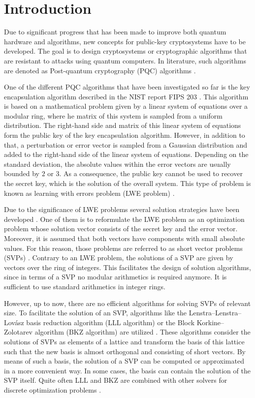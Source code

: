 \section{Introduction}

Due to significant progress that has been made to improve both quantum hardware and algorithms, new concepts for public-key cryptosystems have to be developed. The goal is to design cryptosystems or cryptographic algorithms that are resistant to attacks using quantum computers. In literature, such algorithms are denoted as Post-quantum cryptography (PQC) algorithms \cite{kumar2020post,bernstein17}. 

One of the different PQC algorithms that have been investigated so far is the key encapsulation algorithm described in the NIST report FIPS 203 \cite{NIST203}. This algorithm is based on a mathematical problem given by a linear system of equations over a modular ring, where he matrix of this system is sampled from a uniform distribution. The right-hand side and matrix of this linear system of equations form the public key of the key encapsulation algorithm. However, in addition to that, a perturbation or error vector is sampled from a Gaussian distribution and added to the right-hand side of the linear system of equations. Depending on the standard deviation, the absolute values within the error vectors are usually bounded by $2$ or $3$. As a consequence, the public key cannot be used to recover the secret key, which is the solution of the overall system. This type of problem is known as learning with errors problem (LWE problem) \cite{Albrecht17}. 

Due to the significance of LWE problems several solution strategies have been developed \cite{Peikert16}. One of them is to reformulate the LWE problem as an optimization problem whose solution vector consists of the secret key and the error vector. Moreover, it is assumed that both vectors have components with small absolute values. For this reason, those problems are referred to as short vector problems (SVPs) \cite{uemura2021shortest}. Contrary to an LWE problem, the solutions of a SVP are given by vectors over the ring of integers. This facilitates the design of solution algorithms, since in terms of a SVP no modular arithmetics is required anymore. It is sufficient to use standard arithmetics in integer rings. 

However, up to now, there are no efficient algorithms for solving SVPs of relevant size. To facilitate the solution of an SVP, algorithms like the Lenstra–Lenstra–Lovász basis reduction algorithm (LLL algorithm) or the Block Korkine–Zolotarev algorithm (BKZ algorithm) are utilized \cite{Schneider10,Xia22,LLL82,koppl2024resilience,li2025complete}. These algorithms consider the solutions of SVPs as elements of a lattice and transform the basis of this lattice such that the new basis is almost orthogonal and consisting of short vectors. By means of such a basis, the solution of a SVP can be computed or approximated in a more convenient way. In some cases, the basis can contain the solution of the SVP itself. Quite often LLL and BKZ are combined with other solvers for discrete optimization problems \cite{prokop2024grover,Lv22}.

